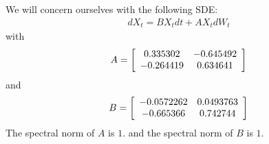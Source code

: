 We will concern ourselves with the following SDE:
\begin{align*}
	 dX_t = B X_t dt + A X_t dW_t
\end{align*}
with\begin{align*}
A=
\left[\begin{array}[c]{*{2}{c}}
0.335302 &-0.645492 \\
-0.264419 &0.634641 \\
\end{array}\right]
\end{align*}
 and 
\begin{align*}
B=
\left[\begin{array}[c]{*{2}{c}}
-0.0572262 &0.0493763 \\
-0.665366 &0.742744 \\
\end{array}\right]
\end{align*}
The spectral norm of $A$ is $1$.
and the spectral norm of $B$ is $1$.
